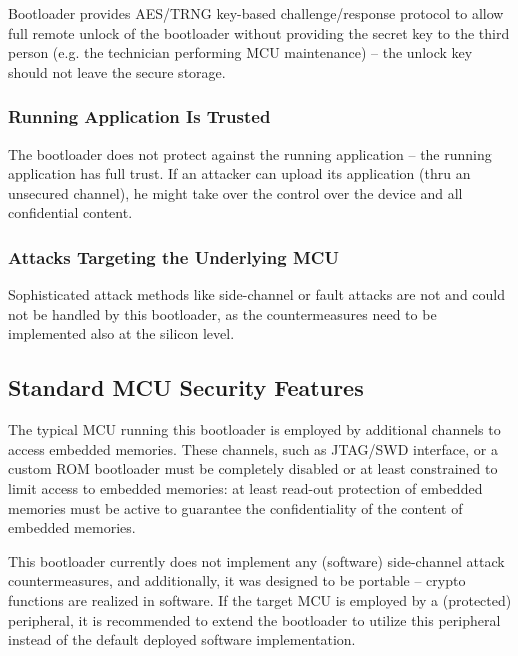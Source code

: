 Bootloader provides AES/TRNG key-based challenge/response protocol to allow full remote unlock of the bootloader
without providing the secret key to the third person (e.g. the technician performing MCU maintenance) -- the unlock key should not leave the secure storage.


\subsubsection*{Running Application Is Trusted}

The bootloader does not protect against the running application -- the running application has full trust. 
If an attacker can upload its application (thru an unsecured channel), he might take over the control over the device and all confidential content.

\subsubsection*{Attacks Targeting the Underlying MCU}

Sophisticated attack methods like side-channel or fault attacks are not and could not be handled by this bootloader,
as the countermeasures need to be implemented also at the silicon level.

\subsection{Standard MCU Security Features} \label{sec:security:mcu}
 
The typical MCU running this bootloader is employed by additional channels to access embedded memories. These channels, such as JTAG/SWD interface, 
or a custom ROM bootloader must be completely disabled or at least constrained to limit access to embedded memories: 
at least read-out protection of embedded memories must be active to guarantee the confidentiality of the content of embedded memories.

This bootloader currently does not implement any (software) side-channel attack countermeasures, 
and additionally, it was designed to be portable -- crypto functions are realized in software. If the target MCU is employed by a (protected) peripheral, 
it is recommended to extend the bootloader to utilize this peripheral instead of the default deployed software implementation. 

